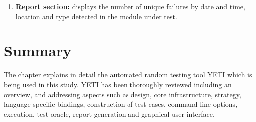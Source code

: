 \begin{enumerate}
\item \textbf{Report section:} displays the number of unique failures by date and time, location and type detected in the module under test. 
\end{enumerate}


\section{Summary}
The chapter explains in detail the automated random testing tool YETI which is being used in this study. YETI has been thoroughly reviewed including an overview, and addressing aspects such as design, core infrastructure, strategy, language-specific bindings, construction of test cases, command line options, execution, test oracle, report generation and graphical user interface.


